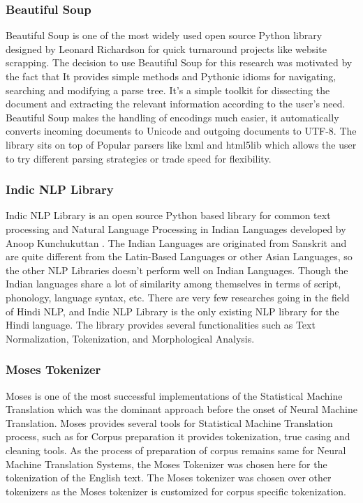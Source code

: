 \subsubsection{Beautiful Soup}
Beautiful Soup is one of the most widely used open source Python library designed by Leonard Richardson for quick turnaround projects like website scrapping\citep{bs4}. The decision to use Beautiful Soup for this research was motivated by the fact that It provides simple methods and Pythonic idioms for navigating, searching and modifying a parse tree. It’s a simple toolkit for dissecting the document and extracting the relevant information according to the user’s need. Beautiful Soup makes the handling of encodings much easier, it automatically converts incoming documents to Unicode and outgoing documents to UTF-8. The library sits on top of Popular parsers like lxml and html5lib which allows the user to try different parsing strategies or trade speed for flexibility. 
\subsubsection{Indic NLP Library}
Indic NLP Library\citep{Kunchukuttan2013} is an open source Python based library for common text processing and Natural Language Processing in Indian Languages developed by Anoop Kunchukuttan .  The Indian Languages are originated from Sanskrit and are quite different from the Latin-Based Languages or other Asian Languages, so the other NLP Libraries doesn’t perform well on Indian Languages. Though the Indian languages share a lot of similarity among themselves in terms of script, phonology, language syntax, etc. There are very few researches going in the field of Hindi NLP, and Indic NLP Library is the only existing NLP library for the Hindi language. The library provides several functionalities such as Text Normalization, Tokenization, and Morphological Analysis.
\subsubsection{Moses Tokenizer}
Moses\citep{Koehn:2007:MOS:1557769.1557821} is one of the most successful implementations of the Statistical Machine Translation which was the dominant approach before the onset of Neural Machine Translation. Moses provides several tools for Statistical Machine Translation process, such as for Corpus preparation it provides tokenization, true casing and cleaning tools. As the process of preparation of corpus remains same for Neural Machine Translation Systems, the Moses Tokenizer was chosen here for the tokenization of the English text. The Moses tokenizer was chosen over other tokenizers as the Moses tokenizer is customized for corpus specific tokenization.


